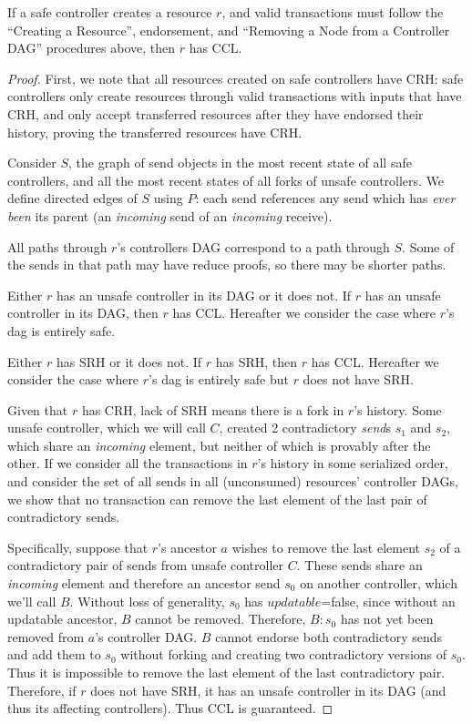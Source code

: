 \documentclass[a4paper,USenglish,cleveref, autoref, thm-restate, anonymous]{lipics-v2021}
\begin{document}
\begin{theorem}
    If a safe controller creates a resource $r$, and valid transactions must follow the ``Creating a Resource'', endorsement, and ``Removing a Node from a Controller DAG'' procedures above, then $r$ has CCL.
\end{theorem}
\begin{proof}
First, we note that all resources created on safe controllers have CRH: safe controllers only create resources through valid transactions with inputs that have CRH, and only accept transferred resources after they have endorsed their history, proving the transferred resources have CRH. 

Consider $S$, the graph of send objects in the most recent state of all safe controllers, and all the most recent states of all forks of unsafe controllers. 
We define directed edges of $S$ using $P$: each send references any send which has \emph{ever been} its parent (an \emph{incoming} send of an \emph{incoming} receive).

All paths through $r$'s controllers DAG correspond to a path through $S$.
Some of the sends in that path may have reduce proofs, so there may be shorter paths.

Either $r$ has an unsafe controller in its DAG or it does not.
If $r$ has an unsafe controller in its DAG, then $r$ has CCL. 
Hereafter we consider the case where $r$'s dag is entirely safe. 

Either $r$ has SRH or it does not.
If $r$ has SRH, then $r$ has CCL. 
Hereafter we consider the case where $r$'s dag is entirely safe but $r$ does not have SRH.

Given that $r$ has CRH, lack of SRH means there is a fork in $r$'s history.
Some unsafe controller, which we will call $C$, created 2 contradictory \emph{send}s $s_1$ and $s_2$, which share an \emph{incoming} element, but neither of which is provably after the other.
If we consider all the transactions in $r$'s history in some serialized order, and consider the set of all sends in all (unconsumed) resources' controller DAGs, we show that no transaction can remove the last element of the last pair of contradictory sends. 

Specifically, suppose that $r$'s ancestor $a$ wishes to remove the last element $s_2$ of a contradictory pair of sends from unsafe controller $C$.
These sends share an \emph{incoming} element and therefore an ancestor send $s_0$ on another controller, which we'll call $B$. 
Without loss of generality, $s_0$ has $updatable$=false, since without an updatable ancestor, $B$ cannot be removed.
Therefore, $B:s_0$ has not yet been removed from $a$'s controller DAG.
$B$ cannot endorse both contradictory sends and add them to $s_0$ without forking and creating two contradictory versions of $s_0$.
Thus it is impossible to remove the last element of the last contradictory pair. 
Therefore, if $r$ does not have SRH, it has an unsafe controller in its DAG (and thus its affecting controllers). 
Thus CCL is guaranteed.

\end{proof}
\end{document}
